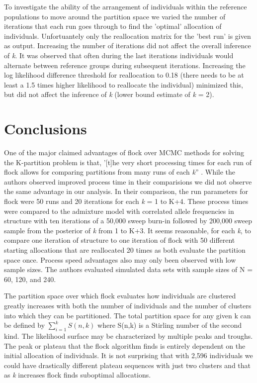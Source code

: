 To investigate the ability of the arrangement of individuals within the reference 
populations to move around the partition space we varied the number of iterations that 
each run goes through to find the 'optimal' allocation of individuals. Unfortuantely 
only the reallocation matrix for the 'best run' is given as output. Increasing the 
number of iterations did not affect the overall inference of \textit{k}. It was 
observed that often during the last iterations individuals would alternate between 
reference groups during subsequent iterations. Increasing the log likelihood 
difference threshold for reallocation to 0.18 (there needs to be at least a 1.5 times 
higher likelihood to reallocate the individual) minimized this, but did not affect the 
inference of \textit{k} (lower bound estimate of \textit{k} = 2). 


\section*{Conclusions}

One of the major claimed advantages of {\sc flock} over MCMC methods for solving the 
K-partition problem is that, '[t]he very short processing times for each run of {\sc flock} allows for
 comparing partitions from many runs of each \textit{k}'' \citep[][p.~735]{Duc&Tur2012}.
While the authors observed improved process time in their 
comparisions we did not observe the same advantage in our analysis. In their comparison, the 
run parameters for {\sc flock} were 50 runs and 20 iterations for each \textit{k} = 1 to K+4. 
These process times were compared to the admixture model with correlated allele 
frequencies in {\sc structure} with ten iterations of a 50,000 sweep burn-in followed 
by 200,000 sweep sample from the posterior of \textit{k} from 1 to K+3. 
It seems reasonable, for each \textit{k}, to compare one iteration of {\sc structure} 
to one iteration of {\sc flock} with 50 different starting allocations that are reallocated 20 times 
as both evaluate the partition space once. Process speed advantages also may only been observed 
with low sample sizes. The authors evaluated simulated data sets with sample sizes of N = 60, 120, 
and 240. 

The partition space over which {\sc flock} evaluates how individuals are clustered 
greatly increases with both the number of individuals and the number of clusters into 
which they can be partitioned. The total partition space for any given k can be 
defined by $\sum\limits_{i=1}^k S(n,k)$ where S(n,k) is a Stirling number of the 
second kind. The likelihood surface may be characterized by multiple peaks and troughs.
The peak or plateau that the  {\sc flock} algorithm finds is entirely dependent on the initial allocation of 
individuals. It is not surprising that with 2,596 individuals we could have 
drastically different plateau sequences with just two clusters and that as \textit{k} increases
{\sc flock} finds suboptimal allocations. 

